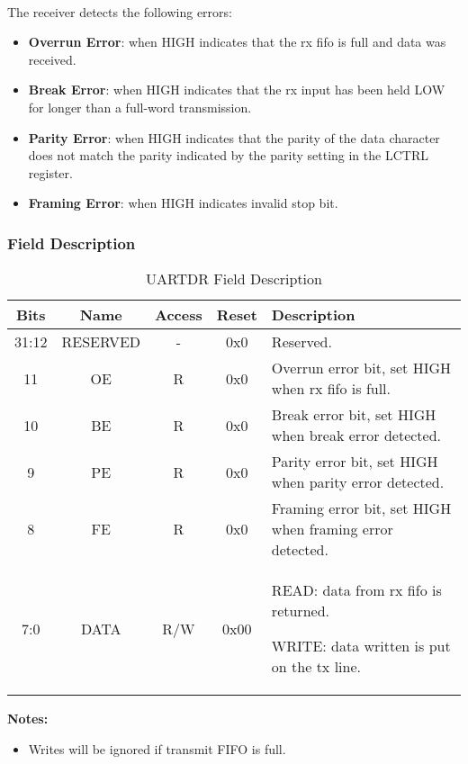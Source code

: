 \documentclass[a4paper,12pt]{article}
\begin{document}
\noindent\\
The receiver detects the following errors:
\begin{itemize}
\item\textbf{Overrun Error}: when HIGH indicates that the rx fifo is full and data was received.

\item\textbf{Break Error}: when HIGH indicates that the rx input has been held LOW for longer than a
full-word transmission.

\item\textbf{Parity Error}: when HIGH indicates that the parity of the data character does not
match the parity indicated by the parity setting in the LCTRL register.

\item\textbf{Framing Error}: when HIGH indicates invalid stop bit.
\end{itemize}

\subsubsection*{Field Description}
\renewcommand{\arraystretch}{1.5}
\begin{table}[H]
\centering
\begin{tabular}{|c|c|c|c|m{8cm}|}
\hline
\textbf{Bits} & \textbf{Name} & \textbf{Access} & \textbf{Reset} & \textbf{Description} \\
\hline
31:12 & RESERVED & - & 0x0 & Reserved. \\
\hline
11 & OE & R & 0x0 & Overrun error bit, set HIGH when rx fifo is full.\\
\hline
10 & BE & R & 0x0 & Break error bit, set HIGH when break error detected.\\
\hline
9 & PE & R & 0x0 & Parity error bit, set HIGH when parity error detected.\\
\hline
8 & FE & R & 0x0 & Framing error bit, set HIGH when framing error detected.\\
\hline
7:0 & DATA & R/W & 0x00 &
READ: data from rx fifo is returned.\par
WRITE: data written is put on the tx line.\\
\hline
\end{tabular}
\caption{UARTDR Field Description}\label{tab:UARTDR}
\end{table}

\vspace{1em}
\noindent\textbf{Notes:}
\begin{itemize}
    \item Writes will be ignored if transmit FIFO is full.
\end{itemize}
\end{document}
